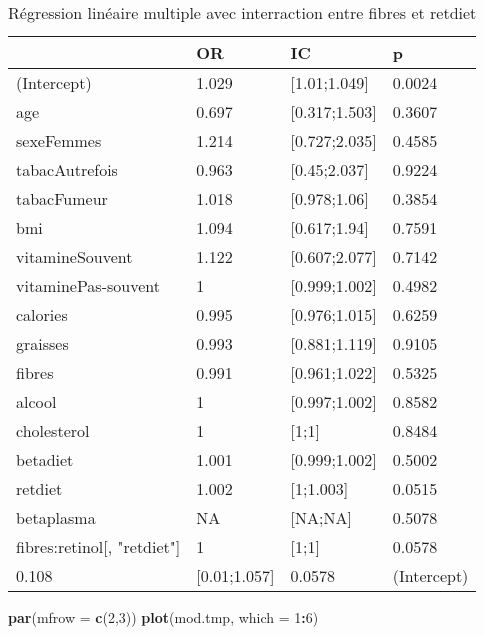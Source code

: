 \documentclass[]{article}
\newenvironment{Shaded}{\begin{snugshade}}{\end{snugshade}}
\newcommand{\KeywordTok}[1]{\textcolor[rgb]{0.13,0.29,0.53}{\textbf{#1}}}
\newcommand{\DataTypeTok}[1]{\textcolor[rgb]{0.13,0.29,0.53}{#1}}
\newcommand{\DecValTok}[1]{\textcolor[rgb]{0.00,0.00,0.81}{#1}}
\newcommand{\OperatorTok}[1]{\textcolor[rgb]{0.81,0.36,0.00}{\textbf{#1}}}
\newcommand{\NormalTok}[1]{#1}
\begin{document}
\begin{table}

\caption{\label{tab:unnamed-chunk-90}Régression linéaire multiple avec interraction entre fibres et retdiet}
\centering
\begin{tabular}[t]{l|l|l|l}
\hline
  & OR & IC & p\\
\hline
\rowcolor[HTML]{BBD2E1}  (Intercept) & 1.029 & [1.01;1.049] & 0.0024\\
\hline
age & 0.697 & [0.317;1.503] & 0.3607\\
\hline
\rowcolor[HTML]{BBD2E1}  sexeFemmes & 1.214 & [0.727;2.035] & 0.4585\\
\hline
tabacAutrefois & 0.963 & [0.45;2.037] & 0.9224\\
\hline
\rowcolor[HTML]{BBD2E1}  tabacFumeur & 1.018 & [0.978;1.06] & 0.3854\\
\hline
bmi & 1.094 & [0.617;1.94] & 0.7591\\
\hline
\rowcolor[HTML]{BBD2E1}  vitamineSouvent & 1.122 & [0.607;2.077] & 0.7142\\
\hline
vitaminePas-souvent & 1 & [0.999;1.002] & 0.4982\\
\hline
\rowcolor[HTML]{BBD2E1}  calories & 0.995 & [0.976;1.015] & 0.6259\\
\hline
graisses & 0.993 & [0.881;1.119] & 0.9105\\
\hline
\rowcolor[HTML]{BBD2E1}  fibres & 0.991 & [0.961;1.022] & 0.5325\\
\hline
alcool & 1 & [0.997;1.002] & 0.8582\\
\hline
\rowcolor[HTML]{BBD2E1}  cholesterol & 1 & [1;1] & 0.8484\\
\hline
betadiet & 1.001 & [0.999;1.002] & 0.5002\\
\hline
\rowcolor[HTML]{BBD2E1}  retdiet & 1.002 & [1;1.003] & 0.0515\\
\hline
betaplasma & NA & [NA;NA] & 0.5078\\
\hline
\rowcolor[HTML]{BBD2E1}  fibres:retinol[, "retdiet"] & 1 & [1;1] & 0.0578\\
\hline
0.108 & [0.01;1.057] & 0.0578 & (Intercept)\\
\hline
\end{tabular}
\end{table}

\begin{Shaded}
\begin{Highlighting}[]
\KeywordTok{par}\NormalTok{(}\DataTypeTok{mfrow =} \KeywordTok{c}\NormalTok{(}\DecValTok{2}\NormalTok{,}\DecValTok{3}\NormalTok{))}
\KeywordTok{plot}\NormalTok{(mod.tmp, }\DataTypeTok{which =} \DecValTok{1}\OperatorTok{:}\DecValTok{6}\NormalTok{)}
\end{Highlighting}
\end{Shaded}
\end{document}
